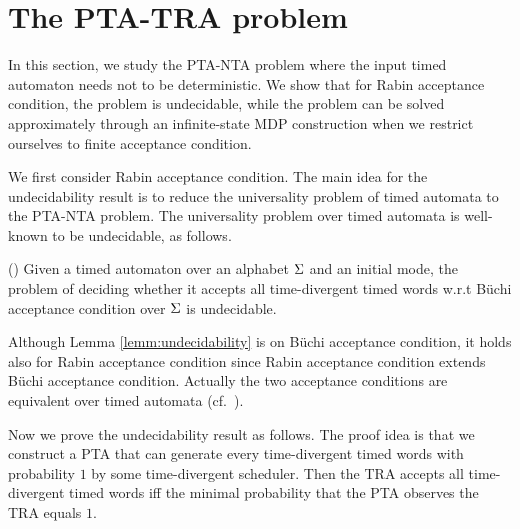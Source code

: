 \section{The PTA-TRA problem}
In this section, we study the PTA-NTA problem where the input timed automaton needs not to be deterministic.
We show that for Rabin acceptance condition, the problem is undecidable, while the problem can be solved approximately through an infinite-state MDP construction when we restrict ourselves to finite acceptance condition.

We first consider Rabin acceptance condition. The main idea for the undecidability result is to reduce the universality problem of timed automata to the PTA-NTA problem. The universality problem over timed automata is well-known to be undecidable, as follows.

%
%
\begin{lemma}{(\cite[Theorem 5.2]{DBLP:journals/tcs/AlurD94})}\label{lemm:undecidability}
Given a timed automaton over an alphabet $\Sigma$ and an initial mode, the problem of deciding whether it accepts all time-divergent timed words w.r.t B\"{u}chi acceptance condition over $\Sigma$ is undecidable.
\end{lemma}
%
Although Lemma \ref{lemm:undecidability} is on  B\"{u}chi acceptance condition, it holds also for Rabin acceptance condition since Rabin acceptance condition extends  B\"{u}chi acceptance condition.
Actually the two acceptance conditions are equivalent over timed automata (cf.~\cite[Theorem 3.20]{DBLP:journals/tcs/AlurD94}).

Now we prove the undecidability result as follows.
The proof idea is that we construct a PTA that can generate every time-divergent timed words with probability $1$ by some time-divergent scheduler.
Then the TRA accepts all time-divergent timed words iff the minimal probability that the PTA observes the TRA equals $1$.

